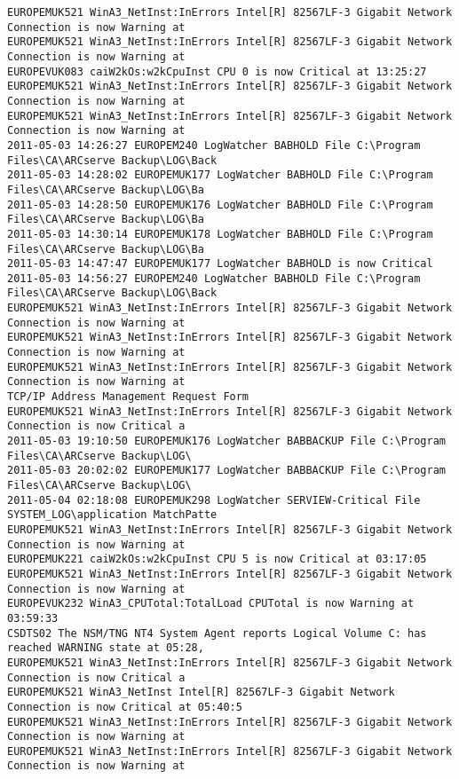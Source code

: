 \begin{lstlisting}
EUROPEMUK521 WinA3_NetInst:InErrors Intel[R] 82567LF-3 Gigabit Network Connection is now Warning at
EUROPEMUK521 WinA3_NetInst:InErrors Intel[R] 82567LF-3 Gigabit Network Connection is now Warning at
EUROPEVUK083 caiW2kOs:w2kCpuInst CPU 0 is now Critical at 13:25:27
EUROPEMUK521 WinA3_NetInst:InErrors Intel[R] 82567LF-3 Gigabit Network Connection is now Warning at
EUROPEMUK521 WinA3_NetInst:InErrors Intel[R] 82567LF-3 Gigabit Network Connection is now Warning at
2011-05-03 14:26:27 EUROPEM240 LogWatcher BABHOLD File C:\Program Files\CA\ARCserve Backup\LOG\Back
2011-05-03 14:28:02 EUROPEMUK177 LogWatcher BABHOLD File C:\Program Files\CA\ARCserve Backup\LOG\Ba
2011-05-03 14:28:50 EUROPEMUK176 LogWatcher BABHOLD File C:\Program Files\CA\ARCserve Backup\LOG\Ba
2011-05-03 14:30:14 EUROPEMUK178 LogWatcher BABHOLD File C:\Program Files\CA\ARCserve Backup\LOG\Ba
2011-05-03 14:47:47 EUROPEMUK177 LogWatcher BABHOLD is now Critical
2011-05-03 14:56:27 EUROPEM240 LogWatcher BABHOLD File C:\Program Files\CA\ARCserve Backup\LOG\Back
EUROPEMUK521 WinA3_NetInst:InErrors Intel[R] 82567LF-3 Gigabit Network Connection is now Warning at
EUROPEMUK521 WinA3_NetInst:InErrors Intel[R] 82567LF-3 Gigabit Network Connection is now Warning at
EUROPEMUK521 WinA3_NetInst:InErrors Intel[R] 82567LF-3 Gigabit Network Connection is now Warning at
TCP/IP Address Management Request Form
EUROPEMUK521 WinA3_NetInst:InErrors Intel[R] 82567LF-3 Gigabit Network Connection is now Critical a
2011-05-03 19:10:50 EUROPEMUK176 LogWatcher BABBACKUP File C:\Program Files\CA\ARCserve Backup\LOG\
2011-05-03 20:02:02 EUROPEMUK177 LogWatcher BABBACKUP File C:\Program Files\CA\ARCserve Backup\LOG\
2011-05-04 02:18:08 EUROPEMUK298 LogWatcher SERVIEW-Critical File SYSTEM_LOG\application MatchPatte
EUROPEMUK521 WinA3_NetInst:InErrors Intel[R] 82567LF-3 Gigabit Network Connection is now Warning at
EUROPEMUK221 caiW2kOs:w2kCpuInst CPU 5 is now Critical at 03:17:05
EUROPEMUK521 WinA3_NetInst:InErrors Intel[R] 82567LF-3 Gigabit Network Connection is now Warning at
EUROPEVUK232 WinA3_CPUTotal:TotalLoad CPUTotal is now Warning at 03:59:33
CSDTS02 The NSM/TNG NT4 System Agent reports Logical Volume C: has reached WARNING state at 05:28,
EUROPEMUK521 WinA3_NetInst:InErrors Intel[R] 82567LF-3 Gigabit Network Connection is now Critical a
EUROPEMUK521 WinA3_NetInst Intel[R] 82567LF-3 Gigabit Network Connection is now Critical at 05:40:5
EUROPEMUK521 WinA3_NetInst:InErrors Intel[R] 82567LF-3 Gigabit Network Connection is now Warning at
EUROPEMUK521 WinA3_NetInst:InErrors Intel[R] 82567LF-3 Gigabit Network Connection is now Warning at

\end{lstlisting}
